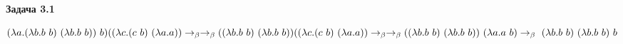 \documentclass{article}
\begin{document}
 
	\centerline{\bf Задача 3.1}
	
	$ \\[1ex]
	(\lambda a.(\lambda b.b \ b) \ (\lambda b.b \ b)) \ b) ((\lambda c.(c \ b) \ (\lambda a.a)) \rightarrow_{\beta} \\[1ex] 
	\rightarrow_{\beta}
	 ((\lambda b.b \ b) \ (\lambda b.b \ b)) ((\lambda c.(c \ b) \ (\lambda a.a)) \rightarrow_{\beta} \\[1ex] 
	 \rightarrow_{\beta} ((\lambda b.b \ b) \ (\lambda b.b \ b)) \ (\lambda a.a \ b) \rightarrow_{\beta} \ (\lambda b.b \ b) \ (\lambda b.b \ b) \ b$
\end{document}
